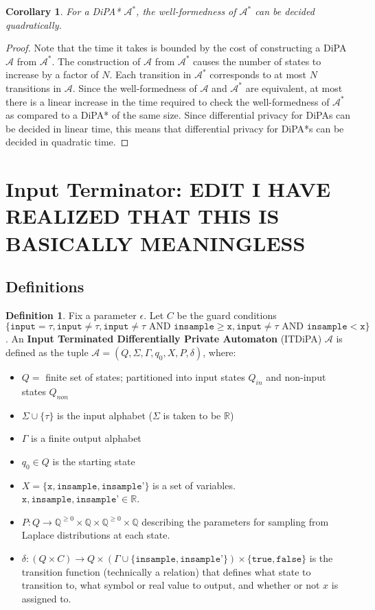\documentclass[12pt]{article}
\newcommand{\QQ}{\mathbb{Q}}
\newcommand{\RR}{\mathbb{R}}
\newcommand{\itgguard}{\texttt{input}\neq\tau \text{ AND } \texttt{insample} \geq \texttt{x}}
\newcommand{\itlguard}{\texttt{input}\neq\tau \text{ AND }\texttt{insample} < \texttt{x}}
\newtheorem{cor}[thm]{Corollary}
\theoremstyle{definition}
\newtheorem{defn}[thm]{Definition}
\begin{document}
\begin{cor}
	For a DiPA* $\mathcal{A}^*$, the well-formedness of $\mathcal{A}^*$ can be decided quadratically.
\end{cor}
\begin{proof}
	Note that the time it takes is bounded by the cost of constructing a DiPA $\mathcal{A}$ from $\mathcal{A}^*$. The construction of $\mathcal{A}$ from $\mathcal{A}^*$ causes the number of states to increase by a factor of $N$. 
	Each transition in $\mathcal{A}^*$ corresponds to at most $N$ transitions in $\mathcal{A}$. Since the well-formedness of $\mathcal{A}$ and $\mathcal{A}^*$ are equivalent, at most there is a linear increase in the time required to check the well-formedness of $\mathcal{A}^*$ as compared to a DiPA* of the same size. Since differential privacy for DiPAs can be decided in linear time, this means that differential privacy for DiPA*s can be decided in quadratic time.
\end{proof}


\newpage

\section{Input Terminator: EDIT I HAVE REALIZED THAT THIS IS BASICALLY MEANINGLESS}

\subsection{Definitions}

\begin{defn}
	Fix a parameter $\epsilon$. Let $C$ be the guard conditions $\{\texttt{input}=\tau, \texttt{input}\neq \tau, \itgguard, \itlguard\}$. An \textbf{Input Terminated Differentially Private Automaton} (ITDiPA) $\mathcal{A}$ is defined as the tuple $\mathcal{A} = (Q, \Sigma, \Gamma, q_0, X, P, \delta)$, where:
	\begin{itemize}
		\item $Q = $ finite set of states; partitioned into input states $Q_{in}$ and non-input states $Q_{non}$
		\item $\Sigma \cup \{\tau\}$ is the input alphabet ($\Sigma$ is taken to be $\RR$)
		\item $\Gamma$ is a finite output alphabet
		\item $q_0\in Q$ is the starting state
		\item $X = \{\texttt{x}, \texttt{insample}, \texttt{insample'}\}$ is a set of variables. $\texttt{x}, \texttt{insample}, \texttt{insample'} \in \RR$.
		\item $P: Q \to \QQ^{\geq 0} \times \QQ \times \QQ^{\geq 0} \times \QQ$ describing the parameters for sampling from Laplace distributions at each state.
		\item $\delta: (Q \times C) \to Q\times (\Gamma \cup \{\texttt{insample}, \texttt{insample'}\}) \times \{\texttt{true}, \texttt{false}\}$ is the transition function (technically a relation) that defines what state to transition to, what symbol or real value to output, and whether or not $x$ is assigned to.
	\end{itemize}
\end{defn}
\end{document}
